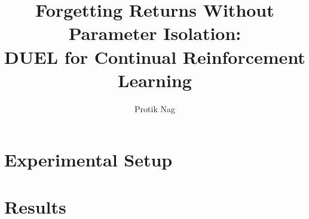\documentclass[11pt]{article}
\title{Forgetting Returns Without Parameter Isolation:\\
       DUEL for Continual Reinforcement Learning}
\author{Protik Nag}
\date{}
\begin{document}
\maketitle


% 

% 
% 
% 
% 
% 
% 
% 

\section{Experimental Setup}\label{sec:setup}
\section{Results}\label{sec:results}



\end{document}
